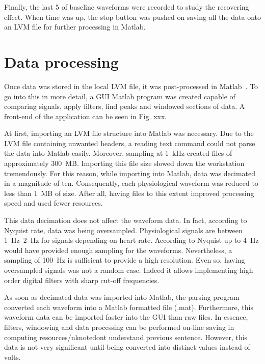 Finally, the last \SI{5}{\min} of baseline waveforms were recorded to study the recovering effect. When time was up, the stop button was pushed on saving all the data onto an LVM file for further processing in Matlab. 

\section{Data processing}
\label{section4.2}

Once data was stored in the local LVM file, it was post-processed in Matlab~\cite{MATLAB:2016}. To go into this in more detail, a GUI Matlab program was created capable of comparing signals, apply filters, find peaks and windowed sections of data. A front-end of the application can be seen in Fig. xxx.


At first, importing an LVM file structure into Matlab was necessary. Due to the LVM file containing unwanted headers, a reading text command could not parse the data into Matlab easily. Moreover, sampling at \SI{1}{\kilo\hertz} created files of approximately \SI{300}{MB}. Importing this file size slowed down the workstation tremendously. For this reason, while importing into Matlab, data was decimated in a magnitude of ten. Consequently, each physiological waveform was reduced to less than \SI{1}{MB} of size. After all, having files to this extent improved processing speed and used fewer resources. 


This data decimation does not affect the waveform data. In fact, according to Nyquist rate, data was being oversampled. Physiological signals are between \SIrange{1}{2}{\hertz} for signals depending on heart rate. According to Nyquist up to \SI{4}{\hertz} would have provided enough sampling for the waveforms. Nevertheless, a sampling of \SI{100}{\hertz} is sufficient to provide a high resolution. Even so, having oversampled signals was not a random case. Indeed it allows implementing high order digital filters with sharp cut-off frequencies. 


As soon as decimated data was imported into Matlab, the parsing program converted each waveform into a Matlab formatted file (.mat). Furthermore, this waveform data can be imported faster into the GUI than raw files. In essence, filters, windowing and data processing can be performed on-line saving in computing resources/nknote{dont understand previous sentence}. However, this data is not very significant until being converted into distinct values instead of volts.

